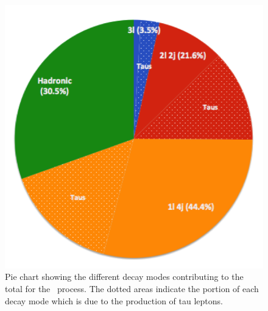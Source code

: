 \begin{figure}
\centering
\includegraphics[scale=.8]{figures/branching_fractions.png}
\caption{Pie chart showing the different decay modes contributing 
to the total \xsec for the \www~process. 
The dotted areas indicate the portion of each decay 
mode which is due to the production of tau leptons.}
\label{fig:branching_fractions}
\end{figure}

